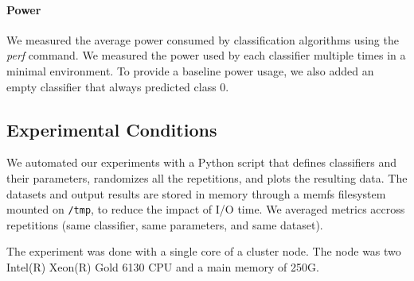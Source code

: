 \paragraph{Power} We measured the average power
consumed by classification algorithms using the
\textit{perf} command. We measured the power used by each
classifier multiple times in a minimal
environment. To provide a baseline power usage, we
also added an empty classifier that always
predicted class 0.

\subsection{Experimental Conditions}
We automated our experiments with a Python script that defines
classifiers and their parameters, randomizes all
the repetitions, and plots the
resulting data. The datasets and output results are stored in memory
through a memfs filesystem mounted on \texttt{/tmp}, to reduce the impact of I/O time.
We averaged metrics accross repetitions (same classifier, same parameters, and
same dataset).

The experiment was done  with a single core of a
cluster node. The node was two Intel(R) Xeon(R)
Gold 6130 CPU and a main memory of 250G.

